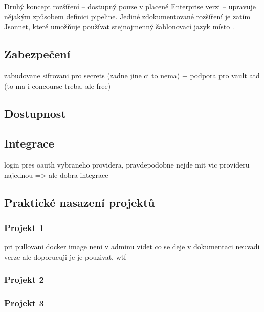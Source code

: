         Druhý koncept rozšíření -- dostupný pouze v placené Enterprise verzi -- upravuje nějakým způsobem definici pipeline. Jediné zdokumentované rozšíření je zatím Jsonnet, které umožňuje používat stejnojmenný šablonovací jazyk místo  \cite{drone-jsonnet}.

    \subsection{Zabezpečení}
        zabudovane sifrovani pro secrets (zadne jine ci to nema) + podpora pro vault atd (to ma i concourse treba, ale free)
        \blind[3]

    \subsection{Dostupnost}
        \cite{drone-ha}
        \blind[3]

    \subsection{Integrace}
        login pres oauth vybraneho providera, pravdepodobne nejde mit vic provideru najednou => ale dobra integrace
        \blind[2]
        \blind[2]

    \subsection{Praktické nasazení projektů}
        \subsubsection{Projekt 1}
            pri pullovani docker image neni v adminu videt co se deje
            v dokumentaci neuvadi verze ale doporucuji je je pouzivat, wtf
            \blind[2]

        \subsubsection{Projekt 2}
            \blind[2]

        \subsubsection{Projekt 3}
            \blind[2]
